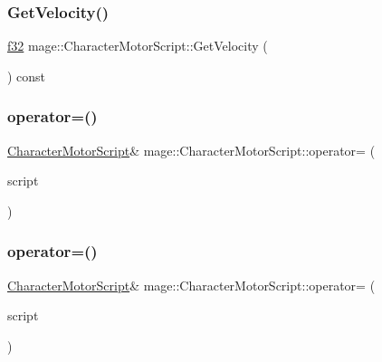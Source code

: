 \subsubsection{\texorpdfstring{Get\+Velocity()}{GetVelocity()}}
{\footnotesize\ttfamily \hyperlink{namespacemage_a6a44ad388483959dc4dff9f2aef91431}{f32} mage\+::\+Character\+Motor\+Script\+::\+Get\+Velocity (\begin{DoxyParamCaption}{ }\end{DoxyParamCaption}) const\hspace{0.3cm}{\ttfamily [noexcept]}}

\hypertarget{classmage_1_1_character_motor_script_a5b66cbbe6b829fe56a1bba5f9093b36e}{}\label{classmage_1_1_character_motor_script_a5b66cbbe6b829fe56a1bba5f9093b36e} 
\subsubsection{\texorpdfstring{operator=()}{operator=()}\hspace{0.1cm}{\footnotesize\ttfamily [1/2]}}
{\footnotesize\ttfamily \hyperlink{classmage_1_1_character_motor_script}{Character\+Motor\+Script}\& mage\+::\+Character\+Motor\+Script\+::operator= (\begin{DoxyParamCaption}\item[{const \hyperlink{classmage_1_1_character_motor_script}{Character\+Motor\+Script} \&}]{script }\end{DoxyParamCaption})\hspace{0.3cm}{\ttfamily [delete]}}

\hypertarget{classmage_1_1_character_motor_script_a05e8822fa633d8642702d125b26069f7}{}\label{classmage_1_1_character_motor_script_a05e8822fa633d8642702d125b26069f7} 
\subsubsection{\texorpdfstring{operator=()}{operator=()}\hspace{0.1cm}{\footnotesize\ttfamily [2/2]}}
{\footnotesize\ttfamily \hyperlink{classmage_1_1_character_motor_script}{Character\+Motor\+Script}\& mage\+::\+Character\+Motor\+Script\+::operator= (\begin{DoxyParamCaption}\item[{\hyperlink{classmage_1_1_character_motor_script}{Character\+Motor\+Script} \&\&}]{script }\end{DoxyParamCaption})\hspace{0.3cm}{\ttfamily [delete]}}

